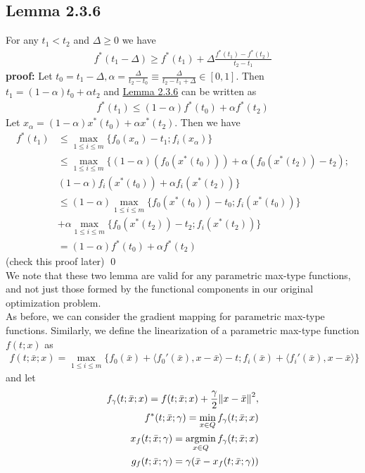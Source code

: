 \documentclass[12pt,a4paper]{article}
\DeclareMathOperator*{\argmin}{argmin}
\begin{document}
	 \subsection*{Lemma 2.3.6}\label{Lem236}
	 For any $t_1 < t_2$ and $\Delta \geq 0$ we have
	 \begin{align*}
	 	f^*(t_1 - \Delta) \geq f^*(t_1) + \Delta \frac{f^*(t_1) - f^*(t_2)}{t_2 - t_1}
	 \end{align*}
	 \textbf{proof:} Let $t_0 = t_1 - \Delta, \alpha = \frac{\Delta}{t_2 - t_0} \equiv \frac{\Delta}{t_2 - t_1 + \Delta} \in [0,1]$. Then $t_1 = (1 - \alpha)t_0 + \alpha t_2$ and \hyperref[lem236]{Lemma 2.3.6} can be written as
	 \begin{align*}
	 	f^*(t_1) \leq (1 - \alpha)f^*(t_0) + \alpha f^*(t_2)
	 \end{align*}
	 Let $x_\alpha = (1 - \alpha)x^*(t_0) + \alpha x^*(t_2)$. Then we have
	 \begin{align*}
	 	f^*(t_1) & \leq \max_{1 \leq i \leq m}\{f_0(x_\alpha) - t_1;f_i(x_\alpha)\} \\
	 	&\leq \max_{1 \leq i \leq m}\{(1 - \alpha)(f_0(x^*(t_0))) + \alpha (f_0(x^*(t_2)) - t_2); \\
	 	&(1 - \alpha)f_i(x^*(t_0)) + \alpha f_i(x^*(t_2))\} \\
	 	&\leq (1 - \alpha)\max_{1 \leq i \leq m}\{f_0(x^*(t_0)) - t_0;f_i(x^*(t_0))\} \\
	 	&+ \alpha \max_{1 \leq i \leq m}\{f_0(x^*(t_2)) - t_2;f_i(x^*(t_2))\} \\
	 	&=(1 - \alpha)f^*(t_0) + \alpha f^*(t_2)
	 \end{align*}
	(check this proof later) \qed \\
	We note that these two lemma are valid for any parametric max-type functions, and not just those formed by the functional components in our original optimization problem. \\
	As before, we can consider the gradient mapping for parametric max-type functions. Similarly, we define the linearization of a parametric max-type function $f(t;x)$ as 
	\begin{align*}
		f(t;\bar{x};x) = \max_{1 \leq i \leq m}\{f_0(\bar{x}) + \langle f_0'(\bar{x}),x - \bar{x} \rangle - t;f_i(\bar{x}) + \langle f_i'(\bar{x}),x - \bar{x} \rangle\}
	\end{align*}
	and let
	\begin{align*}
		f_{\gamma}(t;\bar{x};x) = f(t;\bar{x};x) + \frac{\gamma}{2}\norm{x - \bar{x}}^2, \\
		f^*(t;\bar{x};\gamma) = \min_{x \in Q}f_{\gamma}(t;\bar{x};x) \\
		x_f(t;\bar{x};\gamma) = \argmin_{x \in Q}f_{\gamma}(t;\bar{x};x) \\
		g_f(t;\bar{x};\gamma) = \gamma(\bar{x} - x_f(t;\bar{x};\gamma))
	\end{align*}
\end{document}
